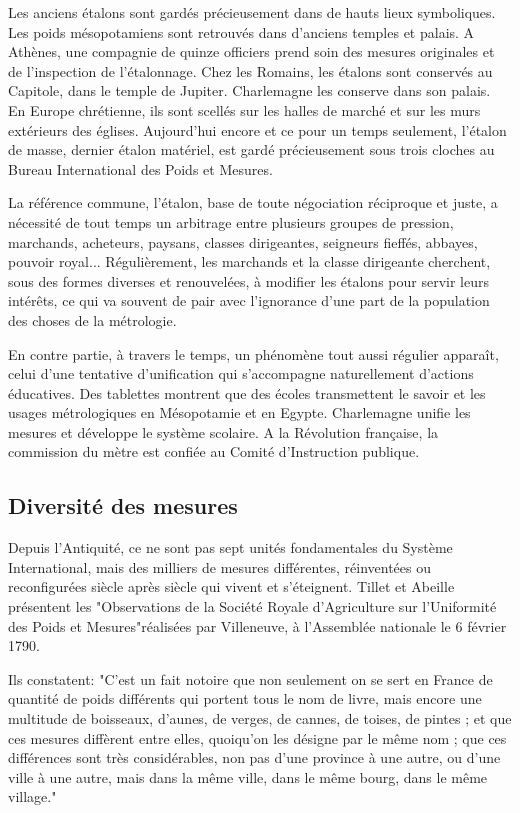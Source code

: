 \documentclass[main.tex]{subfiles}
\begin{document}
Les anciens étalons sont gardés précieusement dans de hauts lieux symboliques.  Les poids mésopotamiens sont retrouvés dans d'anciens temples et palais. A Athènes, une compagnie de quinze officiers prend soin des mesures originales et de l'inspection de l'étalonnage.  Chez les Romains, les étalons sont conservés au Capitole, dans le temple de Jupiter. Charlemagne les conserve dans son palais.  En Europe chrétienne, ils sont scellés sur les halles de marché et sur les murs extérieurs des églises.  Aujourd'hui encore et ce pour un temps seulement, l'étalon de masse, dernier étalon matériel, est gardé précieusement sous trois cloches au Bureau International des Poids et Mesures.

La référence commune, l'étalon, base de toute négociation réciproque et juste, a nécessité de tout temps un arbitrage entre plusieurs groupes de pression, marchands, acheteurs, paysans, classes dirigeantes, seigneurs fieffés, abbayes, pouvoir royal...  Régulièrement, les marchands et la classe dirigeante cherchent, sous des formes diverses et renouvelées, à modifier les étalons pour servir leurs intérêts, ce qui va souvent de pair avec l'ignorance d'une part de la population des choses de la métrologie.

En contre partie, à travers le temps, un phénomène tout aussi régulier apparaît, celui d'une tentative d'unification qui s'accompagne naturellement d'actions éducatives.  Des tablettes montrent que des écoles transmettent le savoir et les usages métrologiques en Mésopotamie et en Egypte.  Charlemagne unifie les mesures et développe le système scolaire.  A la Révolution française, la commission du mètre est confiée au Comité d'Instruction publique.

\subsection{Diversité des mesures}

Depuis l'Antiquité, ce ne sont pas sept unités fondamentales du Système International, mais des milliers de mesures différentes, réinventées ou reconfigurées siècle après siècle qui vivent et s'éteignent. Tillet et Abeille présentent les "Observations de la Société Royale d'Agriculture sur l'Uniformité des Poids et Mesures"réalisées par Villeneuve, à l'Assemblée nationale le 6 février 1790.

Ils constatent: "C'est un fait notoire que non seulement on se sert en France de quantité de poids différents qui portent tous le nom de livre, mais encore une multitude de boisseaux, d'aunes, de verges, de cannes, de toises, de pintes ; et que ces mesures diffèrent entre elles, quoiqu'on les désigne par le même nom ; que ces différences sont très considérables, non pas d'une province à une autre, ou d'une ville à une autre, mais dans la même ville, dans le même bourg, dans le même village."
\end{document}
